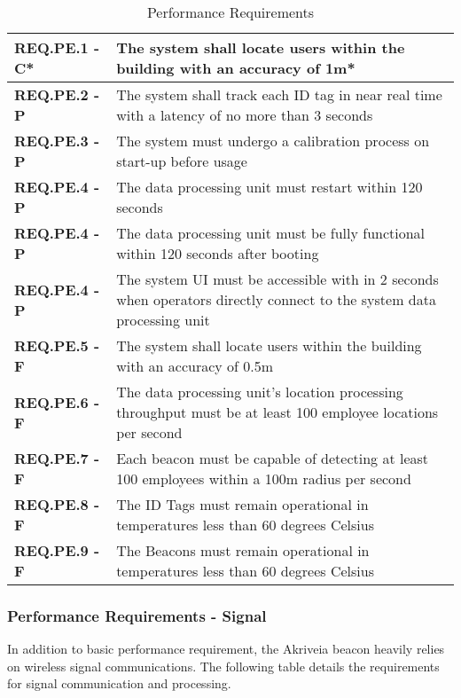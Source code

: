 \bigskip
\bgroup
\def\arraystretch{1.5}
\begin{table}[H]
\centering
\begin{tabular}{ | m{3.5cm} | m{12.5cm} |}
 \hline
 \textbf{REQ.PE.1 - C*} & The system shall locate users within the building with an accuracy of 1m* \\
\hline
 \textbf{REQ.PE.2 - P} & The system shall track each ID tag in near real time with a latency of no more than 3 seconds \\
\hline
 \textbf{REQ.PE.3 - P} & The system must undergo a calibration process on start-up before usage \\
\hline
 \textbf{REQ.PE.4 - P} & The data processing unit must restart within 120 seconds \\
\hline
 \textbf{REQ.PE.4 - P} & The data processing unit must be fully functional within 120 seconds after booting \\
\hline
 \textbf{REQ.PE.4 - P} & The system UI must be accessible with in 2 seconds when operators directly connect to the system data processing unit \\
\hline
 \textbf{REQ.PE.5 - F} & The system shall locate users within the building with an accuracy of 0.5m \\
\hline
 \textbf{REQ.PE.6 - F} & The data processing unit's location processing throughput must be at least 100 employee locations per second \\
\hline
 \textbf{REQ.PE.7 - F} & Each beacon must be capable of detecting at least 100 employees within a 100m radius per second \\
\hline
 \textbf{REQ.PE.8 - F} & The ID Tags must remain operational in temperatures less than 60 degrees Celsius \\
\hline
 \textbf{REQ.PE.9 - F} & The Beacons must remain operational in temperatures less than 60 degrees Celsius \\
\hline
\end{tabular}
\caption{Performance Requirements}
\end{table}

\break

\subsubsection{Performance Requirements - Signal}
In addition to basic performance requirement, the Akriveia beacon heavily relies on wireless signal communications. The following table details the requirements for signal communication and processing.
\bigskip

